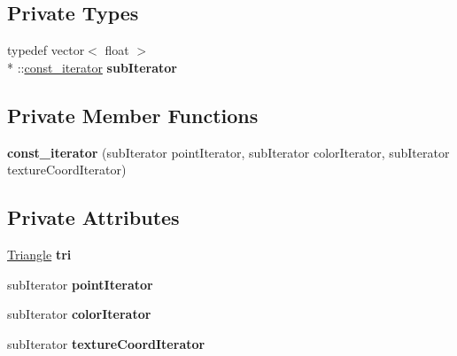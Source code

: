 \subsection*{Private Types}
\begin{DoxyCompactItemize}
\item 
\hypertarget{classMesh__t_1_1const__iterator_a2b700a6a28c6afcf4573ad39077cb24c}{typedef vector$<$ float $>$\\*
\+::\hyperlink{classMesh__t_1_1const__iterator}{const\+\_\+iterator} {\bfseries sub\+Iterator}}\label{classMesh__t_1_1const__iterator_a2b700a6a28c6afcf4573ad39077cb24c}

\end{DoxyCompactItemize}
\subsection*{Private Member Functions}
\begin{DoxyCompactItemize}
\item 
\hypertarget{classMesh__t_1_1const__iterator_a26e718515dda633e3681a1d4659e35b6}{{\bfseries const\+\_\+iterator} (sub\+Iterator point\+Iterator, sub\+Iterator color\+Iterator, sub\+Iterator texture\+Coord\+Iterator)}\label{classMesh__t_1_1const__iterator_a26e718515dda633e3681a1d4659e35b6}

\end{DoxyCompactItemize}
\subsection*{Private Attributes}
\begin{DoxyCompactItemize}
\item 
\hypertarget{classMesh__t_1_1const__iterator_aa0ff7c5e1b1f15e37f6bf47ae48813bc}{\hyperlink{structTriangle}{Triangle} {\bfseries tri}}\label{classMesh__t_1_1const__iterator_aa0ff7c5e1b1f15e37f6bf47ae48813bc}

\item 
\hypertarget{classMesh__t_1_1const__iterator_a956eff916034727260807fc25547ad26}{sub\+Iterator {\bfseries point\+Iterator}}\label{classMesh__t_1_1const__iterator_a956eff916034727260807fc25547ad26}

\item 
\hypertarget{classMesh__t_1_1const__iterator_ac96c04ebda6b049fc2cf54662998760a}{sub\+Iterator {\bfseries color\+Iterator}}\label{classMesh__t_1_1const__iterator_ac96c04ebda6b049fc2cf54662998760a}

\item 
\hypertarget{classMesh__t_1_1const__iterator_a995d3fea982ee9db95e52ac52eba1629}{sub\+Iterator {\bfseries texture\+Coord\+Iterator}}\label{classMesh__t_1_1const__iterator_a995d3fea982ee9db95e52ac52eba1629}

\end{DoxyCompactItemize}
